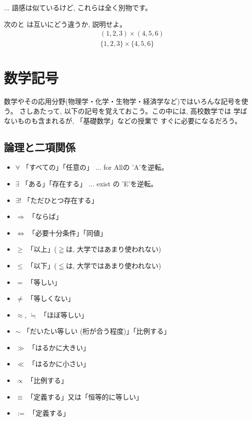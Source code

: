 \begin{freqmiss}{\small{} ... 
語感は似ているけど, これらは全く別物です。}\end{freqmiss}
\mv

\begin{q}\label{q:univ_vectprod_chokuseki} 次のと
は互いにどう違うか, 説明せよ。
\begin{eqnarray}
&&(1, 2, 3)\times(4, 5, 6)\label{eq:univ_vectprod_chokuseki1}\\
&&\{1, 2, 3\}\times\{4, 5, 6\}\label{eq:univ_vectprod_chokuseki2}
\end{eqnarray}\end{q}
\vspace{0.3cm}



\section{数学記号}\label{sect:mathsymbols}
数学やその応用分野(物理学・化学・生物学・経済学など)ではいろんな記号を使う。
さしあたって, 以下の記号を覚えておこう。この中には, 高校数学では
学ばないものも含まれるが, 「基礎数学」などの授業で
すぐに必要になるだろう。\\

\subsection*{論理と二項関係}
\begin{itemize}
\item $\forall$ 「すべての」「任意の」 ... for Allの 'A'を逆転。
\item $\exists$ 「ある」「存在する」 ... exist の 'E'を逆転。
\item $\exists!$ 「ただひとつ存在する」
\item $\Longrightarrow$ 「ならば」
\item $\Longleftrightarrow$ 「必要十分条件」「同値」
\item $\geq$ 「以上」($\geqq$は, 大学ではあまり使われない)
\item $\leq$ 「以下」($\leqq$は, 大学ではあまり使われない)
\item $=$ 「等しい」
\item $\neq$ 「等しくない」
\item $\approx$, $\fallingdotseq$ 「ほぼ等しい」
\item $\sim$ 「だいたい等しい (桁が合う程度)」「比例する」
\item $\gg$ 「はるかに大きい」
\item $\ll$ 「はるかに小さい」
\item $\propto$ 「比例する」
\item $\equiv$ 「定義する」又は「恒等的に等しい」
\item $:=$ 「定義する」
\end{itemize}


